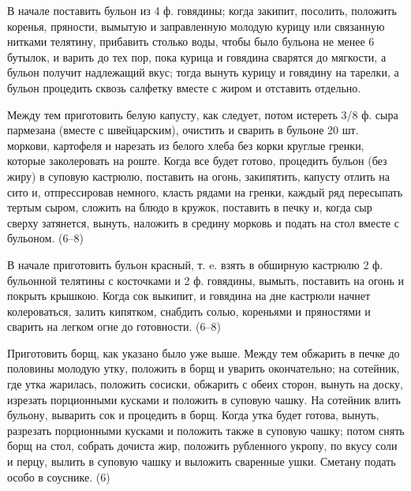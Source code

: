 
В начале поставить бульон из 4 ф. говядины; когда закипит, посолить, положить коренья, пряности, вымытую и заправленную молодую курицу или связанную нитками телятину, прибавить столько воды, чтобы было бульона не менее 6 бутылок, и варить до тех пор, пока курица и говядина сварятся до мягкости, а бульон получит надлежащий вкус; тогда вынуть курицу и говядину на тарелки, а бульон процедить сквозь салфетку вместе с жиром и отставить отдельно.

Между тем приготовить белую капусту, как следует, потом истереть 3/8 ф. сыра пармезана (вместе с швейцарским), очистить и сварить в бульоне 20 шт. моркови, картофеля и нарезать из белого хлеба без корки круглые гренки, которые заколеровать на роште. Когда все будет готово, процедить бульон (без жиру) в суповую кастрюлю, поставить на огонь, закипятить, капусту отлить на сито и, отпрессировав немного, класть рядами на гренки, каждый ряд пересыпать тертым сыром, сложить на блюдо в кружок, поставить в печку и, когда сыр сверху затянется, вынуть, наложить в средину морковь и подать на стол вместе с бульоном. (6–8)


В начале приготовить бульон красный, т. e. взять в обширную кастрюлю 2 ф. бульонной телятины с косточками и 2 ф. говядины, вымыть, поставить на огонь и покрыть крышкою. Когда сок выкипит, и говядина на дне кастрюли начнет колероваться, залить кипятком, снабдить солью, кореньями и пряностями и сварить на легком огне до готовности. (6–8)


Приготовить борщ, как указано было уже выше. Между тем обжарить в печке до половины молодую утку, положить в борщ и уварить окончательно; на сотейник, где утка жарилась, положить сосиски, обжарить с обеих сторон, вынуть на доску, изрезать порционными кусками и положить в суповую чашку. На сотейник влить бульону, выварить сок и процедить в борщ. Когда утка будет готова, вынуть, разрезать порционными кусками и положить также в суповую чашку; потом снять борщ на стол, собрать дочиста жир, положить рубленного укропу, по вкусу соли и перцу, вылить в суповую чашку и выложить сваренные ушки. Сметану подать особо в соуснике. (6)


